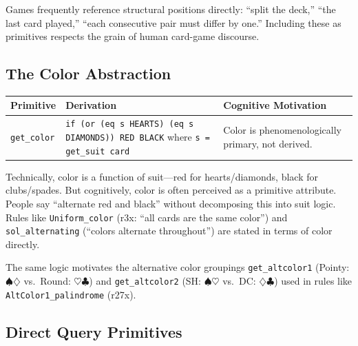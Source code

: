 \documentclass[11pt]{article}
\begin{document}
Games frequently reference structural positions directly: ``split the deck,'' ``the last card played,'' ``each consecutive pair must differ by one.'' Including these as primitives respects the grain of human card-game discourse.

\subsection{The Color Abstraction}

\begin{center}
\begin{tabular}{lp{5cm}p{6cm}}
\toprule
\textbf{Primitive} & \textbf{Derivation} & \textbf{Cognitive Motivation} \\
\midrule
\texttt{get\_color} & \texttt{if (or (eq s HEARTS) (eq s DIAMONDS)) RED BLACK} where \texttt{s = get\_suit card} & Color is phenomenologically primary, not derived. \\
\bottomrule
\end{tabular}
\end{center}

Technically, color is a function of suit---red for hearts/diamonds, black for clubs/spades. But cognitively, color is often perceived as a primitive attribute. People say ``alternate red and black'' without decomposing this into suit logic. Rules like \texttt{Uniform\_color} (r3x: ``all cards are the same color'') and \texttt{sol\_alternating} (``colors alternate throughout'') are stated in terms of color directly.

The same logic motivates the alternative color groupings \texttt{get\_altcolor1} (Pointy: $\spadesuit\diamondsuit$ vs.\ Round: $\heartsuit\clubsuit$) and \texttt{get\_altcolor2} (SH: $\spadesuit\heartsuit$ vs.\ DC: $\diamondsuit\clubsuit$) used in rules like \texttt{AltColor1\_palindrome} (r27x).

\subsection{Direct Query Primitives}
\end{document}
